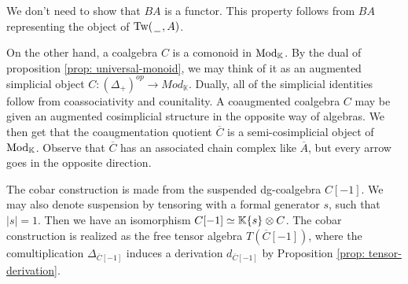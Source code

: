 \documentclass[../thesis.tex]{subfiles}
\begin{document}
            \begin{remark}
                We don't need to show that $BA$ is a functor. This property follows from $BA$ representing the object of $\tt{Tw}(\argument, A)$.
            \end{remark}

            On the other hand, a coalgebra $C$ is a comonoid in $\tt{Mod}_\mathbb{K}$. By the dual of proposition \ref{prop: universal-monoid}, we may think of it as an augmented simplicial object $C:(\Delta_+)^{op} \rightarrow Mod_\mathbb{K}$. Dually, all of the simplicial identities follow from coassociativity and counitality. A coaugmented coalgebra $C$ may be given an augmented cosimplicial structure in the opposite way of algebras. We then get that the coaugmentation quotient $\overline{C}$ is a semi-cosimplicial object of $\tt{Mod}_\mathbb{K}$. Observe that $\overline{C}$ has an associated chain complex like $\overline{A}$, but every arrow goes in the opposite direction.

            \begin{center}

            \end{center}
            
            The cobar construction is made from the suspended dg-coalgebra $C[-1]$. We may also denote suspension by tensoring with a formal generator $s$, such that $|s| = 1$. Then we have an isomorphism $C[-1] \simeq \mathbb{K}\startset{s}\otimes C$. The cobar construction is realized as the free tensor algebra $T(\overline{C}[-1])$, where the comultiplication $\Delta_{\overline{C}[-1]}$ induces a derivation $d_{\overline{C}[-1]}$ by Proposition \ref{prop: tensor-derivation}.
\end{document}
